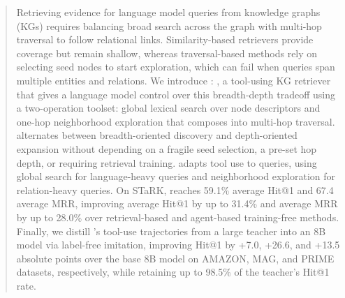 
\begin{abstract}
Retrieving evidence for language model queries from knowledge graphs (KGs) requires balancing broad search across the graph with multi-hop traversal to follow relational links. Similarity-based retrievers provide coverage but remain shallow, whereas traversal-based methods rely on selecting seed nodes to start exploration, which can fail when queries span multiple entities and relations. We introduce \textbf{\retrieverShort}: \retriever, a tool-using KG retriever that gives a language model control over this breadth-depth tradeoff using a two-operation toolset: global lexical search over node descriptors and one-hop neighborhood exploration that composes into multi-hop traversal. \retrieverShort alternates between breadth-oriented discovery and depth-oriented expansion without depending on a fragile seed selection, a pre-set hop depth, or requiring retrieval training. \retrieverShort adapts tool use to queries, using global search for language-heavy queries and neighborhood exploration for relation-heavy queries.
On STaRK, \retrieverShort reaches 59.1\% average Hit@1 and 67.4 average MRR, improving average Hit@1 by up to 31.4\% and average MRR by up to 28.0\% over retrieval-based and agent-based training-free methods.
Finally, we distill \retrieverShort's tool-use trajectories from a large teacher into an 8B model via label-free imitation, improving Hit@1 by +7.0, +26.6, and +13.5 absolute points over the base 8B model on AMAZON, MAG, and PRIME datasets, respectively, while retaining up to 98.5\% of the teacher's Hit@1 rate.
\end{abstract}
